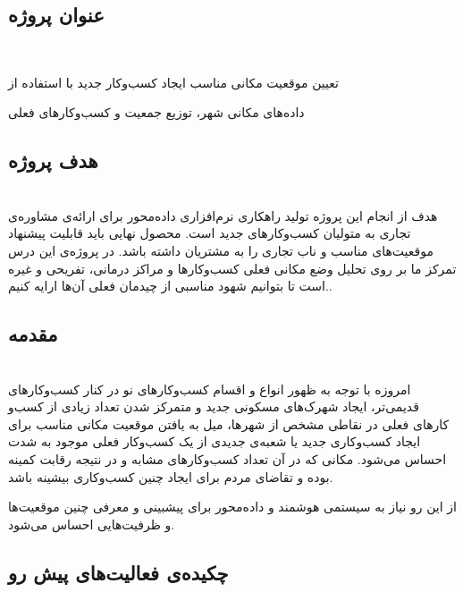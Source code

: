 \subsection*{عنوان پروژه}\ \\

\begin{center}
\large
تعیین موقعیت مکانی مناسب ایجاد کسب‌و‌کار جدید با استفاده از

داده‌های مکانی شهر، توزیع جمعیت و کسب‌وکار‌های فعلی
\end{center}


\subsection*{هدف پروژه}\ \\

هدف از انجام این پروژه تولید راهکاری نرم‌افزاری داده‌محور برای ارائه‌ی مشاوره‌ی تجاری به متولیان کسب‌و‌کار‌های جدید است. محصول نهایی باید قابلیت پیشنهاد موقعیت‌های مناسب و ناب تجاری را به مشتریان داشته باشد.
در پروژه‌ی این درس  تمرکز ما بر روی تحلیل وضع مکانی فعلی کسب‌و‌کار‌ها و مراکز درمانی، تفریحی و غیره است تا بتوانیم شهود مناسبی از چیدمان فعلی  آن‌ها ارایه کنیم..
\vspace*{1cm}

\subsection*{مقدمه}\ \\

امروزه با توجه به ظهور انواع و اقسام کسب‌وکار‌های نو در کنار کسب‌وکار‌های قدیمی‌تر، ایجاد شهرک‌های مسکونی جدید و متمرکز شدن تعداد زیادی از کسب‌و کار‌های فعلی در نقاطی مشخص از شهر‌ها، میل به یافتن موقعیت مکانی مناسب برای ایجاد کسب‌وکاری جدید یا شعبه‌ی جدیدی از یک کسب‌وکار فعلی موجود به شدت احساس می‌شود. مکانی که در آن تعداد کسب‌وکار‌های مشابه و در نتیجه رقابت کمینه بوده و تقاضای مردم برای ایجاد چنین کسب‌وکاری بیشینه باشد.

از این رو نیاز به سیستمی هوشمند و داده‌محور برای پیشبینی و معرفی چنین موقعیت‌ها و ظرفیت‌هایی احساس می‌شود.

\vspace*{1cm}

\subsection*{چکیده‌ی فعالیت‌های پیش رو}\ \\


